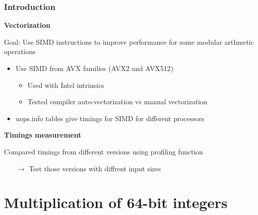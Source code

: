 \documentclass[10pt]{beamer}
\begin{document}
\begin{frame}
\begin{center}
{
        }
    \end{center}
\end{frame}

\begin{frame}
    \frametitle{Introduction}

    \textbf{Vectorization}
    
    Goal: Use SIMD instructions to improve performance for some modular arthmetic operations

    \begin{itemize}
        \item Use SIMD from AVX families (AVX2 and AVX512)
            \begin{itemize}
                \item Used with Intel intrinsics
                \item Tested compiler auto-vectorization vs manual vectorization
            \end{itemize}
        \item uops.info tables give timings for SIMD for different processors
    \end{itemize}
    
    \bigskip
    \textbf{Timings measurement}

    Compared timings from different versions using profiling function
    \begin{itemize}
        \item[$\rightarrow$] Test those versions with diffrent input sizes
    \end{itemize}
\end{frame}

\section{Multiplication of 64-bit integers}
\end{document}

